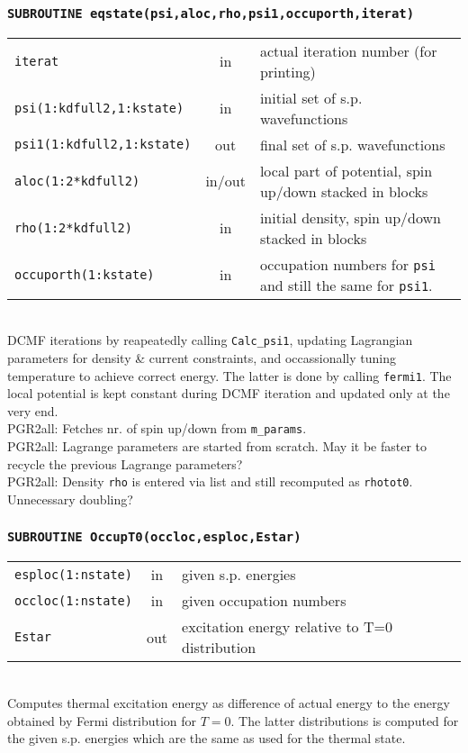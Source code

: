 \documentclass[final,1p]{elsarticle}
\newcommand{\PGRcomm}[1]{{\color{blue}\small PGR2all: #1}}
\begin{document}
\subsubsection*{\tt SUBROUTINE eqstate(psi,aloc,rho,psi1,occuporth,iterat)}
\begin{tabular}{lcl}
 {\tt iterat} & in & actual iteration number (for printing)\\
 {\tt psi(1:kdfull2,1:kstate)} & in & initial set of
 s.p. wavefunctions\\
 {\tt psi1(1:kdfull2,1:kstate)} & out & final set of s.p. wavefunctions\\
 {\tt aloc(1:2*kdfull2)} & in/out & local part of potential, spin
 up/down stacked in blocks\\
 {\tt rho(1:2*kdfull2)} & in & initial density, spin
 up/down stacked in blocks \\
 {\tt occuporth(1:kstate)} & in & occupation numbers for {\tt psi} and
 still the same for {\tt psi1}.\\
\end{tabular}
\\[4pt]
DCMF iterations by reapeatedly calling {\tt Calc\_psi1},
updating Lagrangian parameters for density \& current constraints, and
occassionally tuning temperature to achieve correct energy. The
latter is done by calling {\tt fermi1}. The local potential
is kept constant during DCMF iteration and updated only at the very end.
\\
\PGRcomm{Fetches nr. of spin up/down from {\tt m\_params}.}
\\
\PGRcomm{Lagrange parameters are started from scratch. May it be
  faster to recycle the previous Lagrange parameters?
}
\\
\PGRcomm{Density {\tt rho} is entered via list and still recomputed
as {\tt rhotot0}. Unnecessary doubling?}


\subsubsection*{\tt SUBROUTINE OccupT0(occloc,esploc,Estar)}
\begin{tabular}{lcl}
 {\tt esploc(1:nstate)} & in & given s.p. energies\\
 {\tt occloc(1:nstate)} & in & given occupation numbers\\
 {\tt Estar} & out & excitation energy relative to T=0 distribution\\
\end{tabular}
\\[4pt]
Computes thermal excitation energy as difference of actual energy to
the energy obtained by Fermi distribution for $T=0$. The latter
distributions  is computed for the given s.p. energies which are the
same as used for the thermal state.
\end{document}
